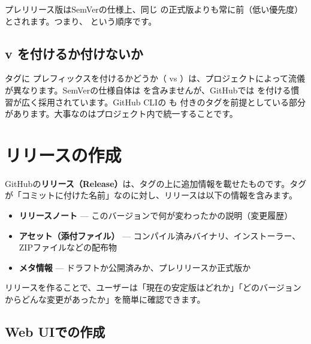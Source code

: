 プレリリース版はSemVerの仕様上、同じ  の正式版よりも常に前（低い優先度）とされます。つまり、 という順序です。

\subsection{v を付けるか付けないか}

タグに  プレフィックスを付けるかどうか（ vs ）は、プロジェクトによって流儀が異なります。SemVerの仕様自体は  を含みませんが、GitHubでは  を付ける慣習が広く採用されています。GitHub CLIの  も  付きのタグを前提としている部分があります。大事なのはプロジェクト内で統一することです。

\section{リリースの作成}

GitHubの\textbf{リリース（Release）}は、タグの上に追加情報を載せたものです。タグが「コミットに付けた名前」なのに対し、リリースは以下の情報を含みます。

\begin{itemize}
  \item \textbf{リリースノート} --- このバージョンで何が変わったかの説明（変更履歴）
  \item \textbf{アセット（添付ファイル）} --- コンパイル済みバイナリ、インストーラー、ZIPファイルなどの配布物
  \item \textbf{メタ情報} --- ドラフトか公開済みか、プレリリースか正式版か
\end{itemize}

リリースを作ることで、ユーザーは「現在の安定版はどれか」「どのバージョンからどんな変更があったか」を簡単に確認できます。

\subsection{Web UIでの作成}

